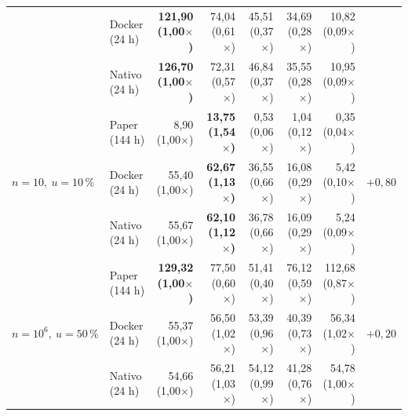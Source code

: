 \documentclass[11pt,a4paper]{article}
\begin{document}
\begin{table}[H]
\begin{tabular}{@{}l l r r r r r c@{}}
  & Docker (24 h) & \textbf{121,90 (1,00$\times$)} & 74,04 (0,61$\times$) & 45,51 (0,37$\times$) & 34,69 (0,28$\times$) & 10,82 (0,09$\times$) & \\
  & Nativo (24 h) & \textbf{126,70 (1,00$\times$)} & 72,31 (0,57$\times$) & 46,84 (0,37$\times$) & 35,55 (0,28$\times$) & 10,95 (0,09$\times$) & \\
\midrule
\multirow{3}{*}{$n=10,\ u=10\,\%$}
  & Paper (144 h) & 8,90 (1,00$\times$) & \textbf{13,75 (1,54$\times$)} & 0,53 (0,06$\times$) & 1,04 (0,12$\times$) & 0,35 (0,04$\times$) & \multirow{3}{*}{$+0,80$} \\
  & Docker (24 h) & 55,40 (1,00$\times$) & \textbf{62,67 (1,13$\times$)} & 36,55 (0,66$\times$) & 16,08 (0,29$\times$) & 5,42 (0,10$\times$) & \\
  & Nativo (24 h) & 55,67 (1,00$\times$) & \textbf{62,10 (1,12$\times$)} & 36,78 (0,66$\times$) & 16,09 (0,29$\times$) & 5,24 (0,09$\times$) & \\
\midrule
\multirow{3}{*}{$n=10^6,\ u=50\,\%$}
  & Paper (144 h) & \textbf{129,32 (1,00$\times$)} & 77,50 (0,60$\times$) & 51,41 (0,40$\times$) & 76,12 (0,59$\times$) & 112,68 (0,87$\times$) & \multirow{3}{*}{$+0,20$} \\
  & Docker (24 h) & 55,37 (1,00$\times$) & 56,50 (1,02$\times$) & 53,39 (0,96$\times$) & 40,39 (0,73$\times$) & 56,34 (1,02$\times$) & \\
  & Nativo (24 h) & 54,66 (1,00$\times$) & 56,21 (1,03$\times$) & 54,12 (0,99$\times$) & 41,28 (0,76$\times$) & 54,78 (1,00$\times$) & \\
\bottomrule
\end{tabular}
\end{table}
\end{document}
